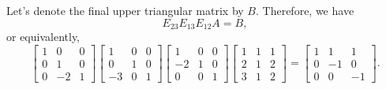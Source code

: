 \begin{frame}
Let's denote the final upper triangular matrix by $B$.  Therefore, we
have
\[
E_{23}E_{13}E_{12}A = B,
\]
or equivalently,
\[
\begin{bmatrix}
  1 & 0 & 0 \\
  0 & 1 & 0 \\
  0 & -2 & 1
\end{bmatrix}
\begin{bmatrix}
  1 & 0 & 0 \\
  0 & 1 & 0 \\
  -3 & 0 & 1
\end{bmatrix}
\begin{bmatrix}
  1 & 0 & 0 \\
  -2 & 1 & 0 \\
  0 & 0 & 1
\end{bmatrix}
\begin{bmatrix}
  1 & 1 & 1 \\
  2 & 1 & 2 \\
  3 & 1 & 2
\end{bmatrix}
=
\begin{bmatrix}
  1 & 1 & 1 \\
  0 & -1 & 0 \\
  0 & 0 & -1
\end{bmatrix}.
\]

\end{frame}

